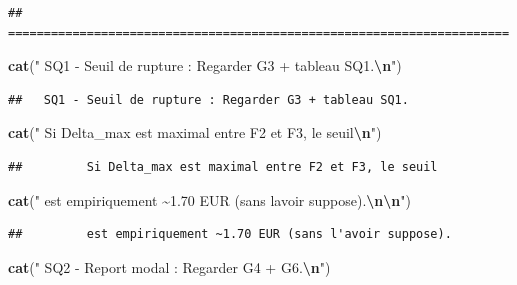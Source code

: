 \documentclass[
]{article}
\newenvironment{Shaded}{\begin{snugshade}}{\end{snugshade}}
\newcommand{\FunctionTok}[1]{\textcolor[rgb]{0.13,0.29,0.53}{\textbf{#1}}}
\newcommand{\NormalTok}[1]{#1}
\newcommand{\SpecialCharTok}[1]{\textcolor[rgb]{0.81,0.36,0.00}{\textbf{#1}}}
\newcommand{\StringTok}[1]{\textcolor[rgb]{0.31,0.60,0.02}{#1}}
\begin{document}
\begin{verbatim}
## ======================================================================
\end{verbatim}

\begin{Shaded}
\begin{Highlighting}[]
\FunctionTok{cat}\NormalTok{(}\StringTok{"  SQ1 {-} Seuil de rupture : Regarder G3 + tableau SQ1.}\SpecialCharTok{\textbackslash{}n}\StringTok{"}\NormalTok{)}
\end{Highlighting}
\end{Shaded}

\begin{verbatim}
##   SQ1 - Seuil de rupture : Regarder G3 + tableau SQ1.
\end{verbatim}

\begin{Shaded}
\begin{Highlighting}[]
\FunctionTok{cat}\NormalTok{(}\StringTok{"        Si Delta\_max est maximal entre F2 et F3, le seuil}\SpecialCharTok{\textbackslash{}n}\StringTok{"}\NormalTok{)}
\end{Highlighting}
\end{Shaded}

\begin{verbatim}
##         Si Delta_max est maximal entre F2 et F3, le seuil
\end{verbatim}

\begin{Shaded}
\begin{Highlighting}[]
\FunctionTok{cat}\NormalTok{(}\StringTok{"        est empiriquement \textasciitilde{}1.70 EUR (sans l\textquotesingle{}avoir suppose).}\SpecialCharTok{\textbackslash{}n\textbackslash{}n}\StringTok{"}\NormalTok{)}
\end{Highlighting}
\end{Shaded}

\begin{verbatim}
##         est empiriquement ~1.70 EUR (sans l'avoir suppose).
\end{verbatim}

\begin{Shaded}
\begin{Highlighting}[]
\FunctionTok{cat}\NormalTok{(}\StringTok{"  SQ2 {-} Report modal : Regarder G4 + G6.}\SpecialCharTok{\textbackslash{}n}\StringTok{"}\NormalTok{)}
\end{Highlighting}
\end{Shaded}
\end{document}
